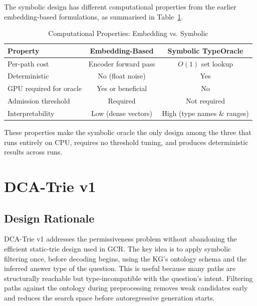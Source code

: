 The symbolic design has different computational properties from the earlier embedding-based formulations, as summarised in Table~\ref{tab:computational_comparison}.

\begin{table}[H]
  \centering
  \caption[Computational Properties: Embedding vs. Symbolic]{Computational Properties: Embedding vs. Symbolic}
  \label{tab:computational_comparison}
  \begin{tabularx}{\textwidth}{|X|c|c|}
    \hline
    \textbf{Property}       & \textbf{Embedding-Based} & \textbf{Symbolic TypeOracle} \\
    \hline
    Per-path cost           & Encoder forward pass     & $O(1)$ set lookup            \\
    \hline
    Deterministic           & No (float noise)         & Yes                          \\
    \hline
    GPU required for oracle & Yes or beneficial        & No                           \\
    \hline
    Admission threshold     & Required                 & Not required                 \\
    \hline
    Interpretability        & Low (dense vectors)      & High (type names \& ranges)  \\
    \hline
  \end{tabularx}
\end{table}

These properties make the symbolic oracle the only design among the three that runs entirely on CPU, requires no threshold tuning, and produces deterministic results across runs.

\section{DCA-Trie v1}
\label{sec:ch3v1}

\subsection{Design Rationale}

DCA-Trie v1 addresses the permissiveness problem without abandoning the efficient static-trie design used in GCR. The key idea is to apply symbolic filtering once, before decoding begins, using the KG's ontology schema and the inferred answer type of the question. This is useful because many paths are structurally reachable but type-incompatible with the question's intent. Filtering paths against the ontology during preprocessing removes weak candidates early and reduces the search space before autoregressive generation starts.

